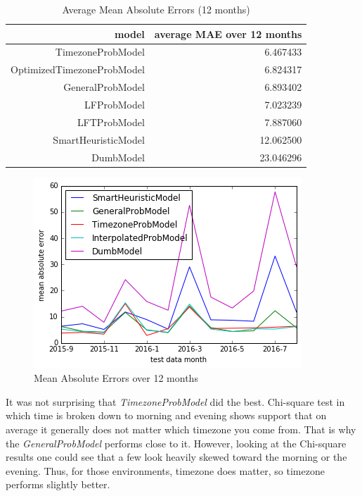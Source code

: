 \documentclass[oneside]{article}
\begin{document}
\begin{table}[]
  \centering
  \caption{Average Mean Absolute Errors (12 months)}
  \label{tab:avg_mae_of_models}
  \begin{tabular}{rr}
    \textbf{model} & \textbf{average MAE over 12 months} \\
    \hline
    TimezoneProbModel &            6.467433 \\
    OptimizedTimezoneProbModel &   6.824317 \\
    GeneralProbModel &             6.893402 \\
    LFProbModel &                  7.023239 \\
    LFTProbModel &                 7.887060 \\
    SmartHeuristicModel &         12.062500 \\
    DumbModel &                   23.046296 \\
    \hline
  \end{tabular}
\end{table}

\begin{figure}[h!]
\centering
\includegraphics[scale=0.8]{img/mae_models.png}
\caption{Mean Absolute Errors over 12 months}
\label{fig:mae_models}
\end{figure}

It was not surprising that \emph{TimezoneProbModel} did the best. Chi-square
test in which time is broken down to morning and evening shows support that on
average it generally does not matter which timezone you come from. That is why
the \emph{GeneralProbModel} performs close to it. However, looking at the
Chi-square results one could see that a few look heavily skewed toward the
morning or the evening. Thus, for those environments, timezone does matter, so
timezone performs slightly better.
\end{document}
